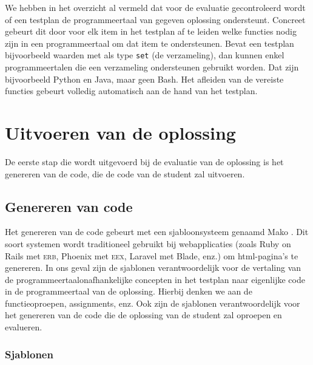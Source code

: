 We hebben in het overzicht al vermeld dat voor de evaluatie gecontroleerd wordt of een testplan de programmeertaal van gegeven oplossing ondersteunt.
Concreet gebeurt dit door voor elk item in het testplan af te leiden welke functies nodig zijn in een programmeertaal om dat item te ondersteunen.
Bevat een testplan bijvoorbeeld waarden met als type \texttt{set} (de verzameling), dan kunnen enkel programmeertalen die een verzameling ondersteunen gebruikt worden.
Dat zijn bijvoorbeeld Python en Java, maar geen Bash.
Het afleiden van de vereiste functies gebeurt volledig automatisch aan de hand van het testplan.

\section{Uitvoeren van de oplossing}\label{sec:uitvoeren-van-de-oplossing}

De eerste stap die wordt uitgevoerd bij de evaluatie van de oplossing is het genereren van de code, die de code van de student zal uitvoeren.

\subsection{Genereren van code}\label{subsec:genereren-van-code}

Het genereren van de code gebeurt met een sjabloonsysteem genaamd Mako \autocite{mako}.
Dit soort systemen wordt traditioneel gebruikt bij webapplicaties (zoals Ruby on Rails met \textsc{erb}, Phoenix met \textsc{eex}, Laravel met Blade, enz.) om html-pagina's te genereren.
In ons geval zijn de sjablonen verantwoordelijk voor de vertaling van de programmeertaalonafhankelijke concepten in het testplan naar eigenlijke code in de programmeertaal van de oplossing.
Hierbij denken we aan de functieoproepen, assignments, enz.
Ook zijn de sjablonen verantwoordelijk voor het genereren van de code die de oplossing van de student zal oproepen en evalueren.

\subsubsection{Sjablonen}

